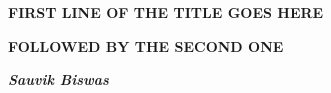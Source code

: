 \documentclass{iitkgpthesis}
\begin{document}
\thispagestyle{empty}
\begin{center}
 \textbf{\large FIRST LINE OF THE TITLE GOES HERE}
\end{center}
 \vspace{-2.5em}
\begin{center}
 \textbf{\large FOLLOWED BY THE SECOND ONE}
\end{center}
\vfill
\begin{flushright}
\textbf{\textit{Sauvik Biswas}} 
\end{flushright}

\newpage
\thispagestyle{empty}
\end{document}
